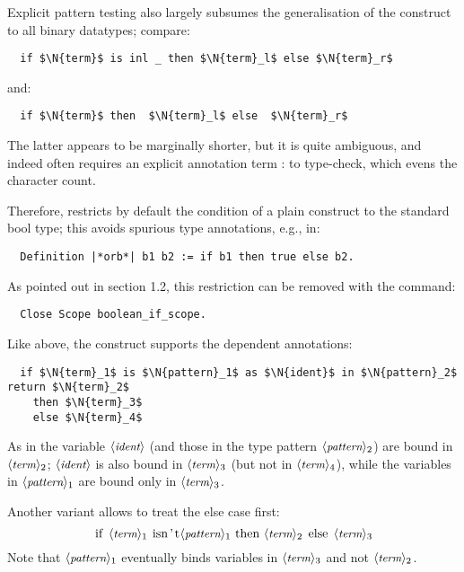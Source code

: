 Explicit pattern testing also largely subsumes the generalisation of
the  construct to all binary datatypes; compare:
\begin{lstlisting}
  if $\N{term}$ is inl _ then $\N{term}_l$ else $\N{term}_r$
\end{lstlisting}
and:
\begin{lstlisting}
  if $\N{term}$ then  $\N{term}_l$ else  $\N{term}_r$
\end{lstlisting}
The latter appears to be marginally shorter, but it is quite
ambiguous, and indeed often
requires an explicit annotation term : \C{{_}+{_}} to type-check,
which evens the character count.

Therefore, \ssr{} restricts by default the condition of a plain 
construct to the standard bool type; this avoids spurious type
annotations, e.g., in:
\begin{lstlisting}
  Definition |*orb*| b1 b2 := if b1 then true else b2.
\end{lstlisting}
As pointed out in section 1.2, this restriction can be removed with
the command:
\begin{lstlisting}
  Close Scope boolean_if_scope.
\end{lstlisting}
Like  above, the  construct supports the dependent
 annotations:
\begin{lstlisting}
  if $\N{term}_1$ is $\N{pattern}_1$ as $\N{ident}$ in $\N{pattern}_2$ return $\N{term}_2$
    then $\N{term}_3$
    else $\N{term}_4$
\end{lstlisting}
As in  the variable $\langle\mbox{\itshape\rmfamily\small ident}\rangle$ (and those in
the type pattern $\langle\mbox{\itshape\rmfamily\small pattern}\rangle_2$) are bound in $\langle\mbox{\itshape\rmfamily\small term}\rangle_2$; $\langle\mbox{\itshape\rmfamily\small ident}\rangle$ is
also bound in $\langle\mbox{\itshape\rmfamily\small term}\rangle_3$ (but not in $\langle\mbox{\itshape\rmfamily\small term}\rangle_4$), while the
variables in $\langle\mbox{\itshape\rmfamily\small pattern}\rangle_1$ are bound only in $\langle\mbox{\itshape\rmfamily\small term}\rangle_3$.

\noindent
Another variant allows to treat the else case first:
\[\C{if}\ \N{term}_1\ \C{isn't }\N{pattern}_1\ \C{then}\ \N{term}_2\ \C{else}
\ \N{term}_3\]
Note that $\langle\mbox{\itshape\rmfamily\small pattern}\rangle_1$ eventually binds variables in $\langle\mbox{\itshape\rmfamily\small term}\rangle_3$
and not $\langle\mbox{\itshape\rmfamily\small term}\rangle_2$.

